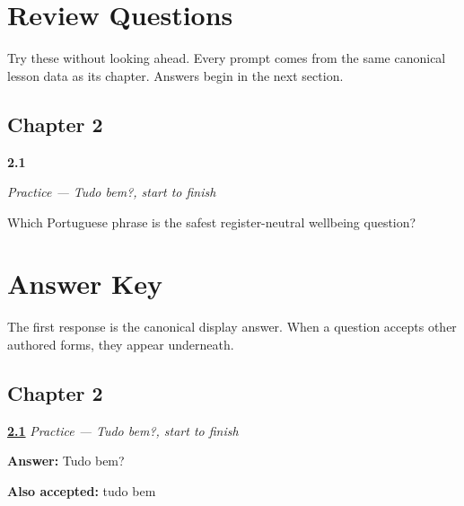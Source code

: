 
\chapter*{Review Questions}

Try these without looking ahead. Every prompt comes from the same canonical lesson data as its chapter. Answers begin in the next section.

\section*{Chapter 2}

\noindent\begin{minipage}[t]{\linewidth}
\raggedright
\hypertarget{review-PT-C02-practice-neutral-question}{\textbf{2.1}} \emph{Practice — Tudo bem?, start to finish}\par
\small Which Portuguese phrase is the safest register-neutral wellbeing question?
\end{minipage}\par\medskip

\chapter*{Answer Key}

The first response is the canonical display answer. When a question accepts other authored forms, they appear underneath.

\section*{Chapter 2}

\noindent\begin{minipage}[t]{\linewidth}
\raggedright
\hyperlink{review-PT-C02-practice-neutral-question}{\textbf{2.1}} \emph{Practice — Tudo bem?, start to finish}\par
\small \textbf{Answer:} Tudo bem?\par
\footnotesize \textbf{Also accepted:} tudo bem
\end{minipage}\par\medskip
